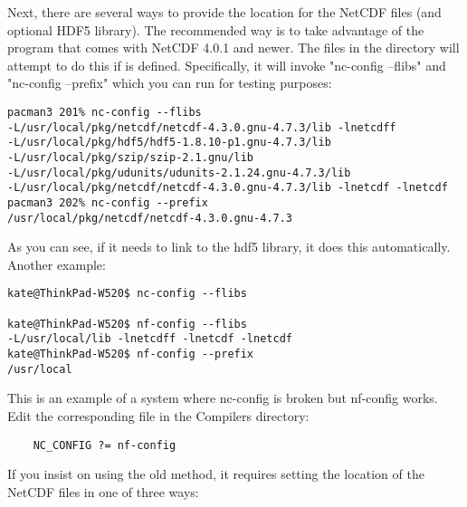 Next, there are several ways to provide the location for the NetCDF
files (and optional HDF5 library). The recommended way is to take
advantage of the  program that comes with NetCDF 4.0.1
and newer. The files in the  directory will attempt
to do this if  is defined. Specifically, it will
invoke "nc-config --flibs" and "nc-config --prefix" which you can
run for testing purposes:
\begin{verbatim}
pacman3 201% nc-config --flibs
-L/usr/local/pkg/netcdf/netcdf-4.3.0.gnu-4.7.3/lib -lnetcdff
-L/usr/local/pkg/hdf5/hdf5-1.8.10-p1.gnu-4.7.3/lib
-L/usr/local/pkg/szip/szip-2.1.gnu/lib
-L/usr/local/pkg/udunits/udunits-2.1.24.gnu-4.7.3/lib
-L/usr/local/pkg/netcdf/netcdf-4.3.0.gnu-4.7.3/lib -lnetcdf -lnetcdf
pacman3 202% nc-config --prefix
/usr/local/pkg/netcdf/netcdf-4.3.0.gnu-4.7.3
\end{verbatim}
As you can see, if it needs to link to the hdf5 library, it does
this automatically. Another example:
\begin{verbatim}
kate@ThinkPad-W520$ nc-config --flibs

kate@ThinkPad-W520$ nf-config --flibs
-L/usr/local/lib -lnetcdff -lnetcdf -lnetcdf
kate@ThinkPad-W520$ nf-config --prefix
/usr/local
\end{verbatim}
This is an example of a system where nc-config is broken but
nf-config works. Edit the corresponding file in the Compilers
directory:
\begin{verbatim}
    NC_CONFIG ?= nf-config
\end{verbatim}
If you insist on using the old method, it requires setting the
location of the NetCDF files in one of three ways:
